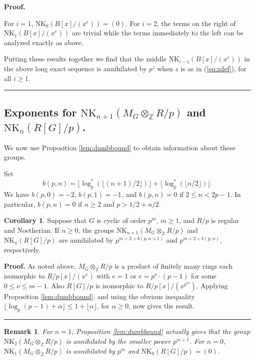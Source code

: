\documentclass[reqno,11pt,letterpaper]{amsart}
\theoremstyle{plain}
\numberwithin{equation}{subsection}
\newtheorem{Remark}[equation]{Remark}
\newtheorem{corollary}[equation]{Corollary}
\theoremstyle{remark}
\theoremstyle{plain}
\theoremstyle{definition}\newtheorem*{notation}{Notation}
\newtheorem{corollary}[theorem]{Corollary}
\newenvironment{proof}[1][Proof]{\noindent\textbf{#1.} }{\ \rule{0.5em}{0.5em}}
\newcommand{\RNK}{\mathrm{NK}}
\newcommand{\BZ}{\mathbb{Z}}
\begin{document}
\begin{proof}
 
 For $i=1$, $\RNK_{0}(B[x]/(x^e) )=(0)$. For $i=2$, the terms on the right of $\RNK_{1}(B[x]/(x^e) )$ are trivial
 while the terms immediately to the left can be analyzed exactly as above.
 
Putting these results together we find that the middle  $\RNK_{i-1}(B[x]/(x^e) )$ in the above 
 long exact sequence is annihilated by $p^z$ when $z$ is as in (\ref{eq:zdef}), for all $i\geq 1$.
 \end{proof}  
 
 
 \subsection{Exponents for $\RNK_{n+1}(M_G\otimes_\BZ R/p)$ and $\RNK_n(R[G]/p)$.}
 
 We now use Proposition \ref{lem:dumbbound}  to obtain information about these groups.  

Set
\[
b(p, n)=\lfloor \log^*_p(\lfloor (n+1)/2\rfloor ) \rfloor  + \lfloor \log^*_p(\lfloor n/2\rfloor) \rfloor.
\]
We have $b(p,0)=-2$, $b(p,1)=-1$, and $b(p, n)=0$ if $2\leq n< 2p-1$. In particular,
 $b(p, n)=0$ if $n\geq 2$ and $p> 1/2+n/2$.


\begin{corollary}\label{cor:truncated}
Suppose that $G$ is cyclic of order $p^m $, $m\geq 1$, and $R/p$ is regular and Noetherian. If $n\geq 0$, the groups
$\RNK_{n+1}(M_G\otimes_\BZ R /p )$  and $\RNK_n(R[G]/p)$ are annihilated by 
$p^{m+2+b(p, n+1) }$
and $p^{m+2+b(p, n) }$, respectively.  
\end{corollary}

\begin{proof}  As noted above,  $M_G\otimes_\BZ R /p$ is a product of finitely many rings each isomorphic to $R/p[x]/(x^e)$ with $e = 1$ or $e = p^\nu \cdot (p-1)$ for some $0 \le \nu \le m-1$. Also  $R[G]/p$ is isomorphic to $R/p[x]/(x^{p^m})$. Applying  Proposition 
\ref{lem:dumbbound}, and using the obvious inequality $\lfloor \log_p(p-1)+\alpha\rfloor \leq 1+\lfloor \alpha\rfloor$, for $\alpha\geq 0$, now gives the result.
\end{proof}

\begin{Remark}\label{rem:smallerexpon}
{\rm  For $n=1$, Proposition 
\ref{lem:dumbbound} actually gives that  the group $\RNK_{2}(M_G\otimes_\BZ R /p)$ is annihilated by the smaller power $p^{m+1 }$.
 For $n=0$, $\RNK_{1}(M_G\otimes_\BZ R /p)$ is annihilated by  $p^{m }$ and $\RNK_{0}( R[G] /p)=(0)$.}
\end{Remark}
\end{document}
